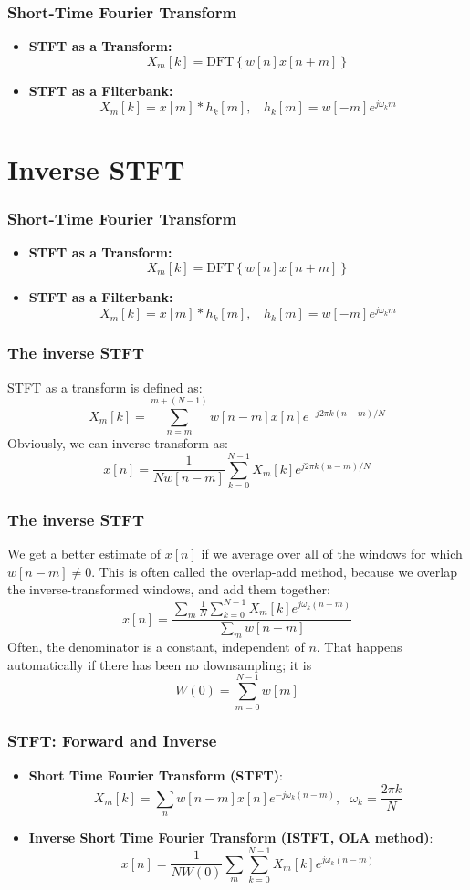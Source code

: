 \documentclass{beamer}
\begin{document}
\begin{frame}
  \frametitle{Short-Time Fourier Transform}
  \begin{itemize}
  \item {\bf STFT as a Transform:}
    \[
    X_m[k] = \mbox{DFT}\left\{w[n]x[n+m]\right\}
    \]
  \item {\bf STFT as a Filterbank:}
    \[
    X_m[k] = x[m] \ast h_k[m],~~~~h_k[m] = w[-m]e^{j\omega_k m}
    \]
  \end{itemize}
\end{frame}


\section{Inverse STFT}
\setcounter{subsection}{1}

\begin{frame}
  \frametitle{Short-Time Fourier Transform}
  \begin{itemize}
  \item {\bf STFT as a Transform:}
    \[
    X_m[k] = \mbox{DFT}\left\{w[n]x[n+m]\right\}
    \]
  \item {\bf STFT as a Filterbank:}
    \[
    X_m[k] = x[m] \ast h_k[m],~~~~h_k[m] = w[-m]e^{j\omega_k m}
    \]
  \end{itemize}
\end{frame}

\begin{frame}
  \frametitle{The inverse STFT}
  STFT as a transform is defined as:
  \[
  X_m[k]= \sum_{n=m}^{m+(N-1)} w[n-m]x[n]e^{-j2\pi k(n-m)/N}
  \]
  Obviously, we can inverse transform as:
  \[
  x[n] = \frac{1}{N w[n-m]}\sum_{k=0}^{N-1} X_m[k]e^{j2\pi k(n-m)/N}
  \]
\end{frame}
\begin{frame}
  \frametitle{The inverse STFT}

  We get a better estimate of $x[n]$ if we average over all of the
  windows for which $w[n-m]\ne 0$.  This is often called the
  overlap-add method, because we overlap the inverse-transformed
  windows, and add them together:
  \[
  x[n] = \frac{\sum_m\frac{1}{N}\sum_{k=0}^{N-1} X_m[k]e^{j\omega_k (n-m)}}{\sum_mw[n-m]}
  \]
  Often, the denominator is a constant, independent of $n$.  That
  happens automatically if there has been no downsampling; it is
  \[
  W(0)=\sum_{m=0}^{N-1} w[m]
  \]
\end{frame}

\begin{frame}
  \frametitle{STFT: Forward and Inverse}
  \begin{itemize}
  \item {\bf Short Time Fourier Transform (STFT)}:
    \[
    X_m[k]= \sum_n w[n-m]x[n]e^{-j\omega_k (n-m)},~~~\omega_k=\frac{2\pi k}{N}
    \]
  \item {\bf Inverse Short Time Fourier Transform (ISTFT, OLA method)}:
    \[
    x[n] = \frac{1}{NW(0)}\sum_m\sum_{k=0}^{N-1} X_m[k]e^{j\omega_k (n-m)}
    \]
  \end{itemize}
\end{frame}
\end{document}
